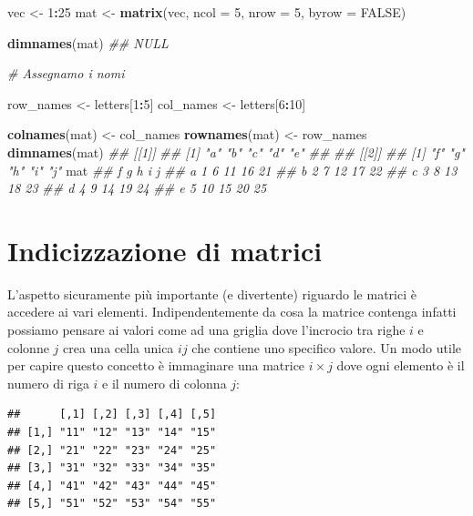 \documentclass[
]{book}
\newenvironment{Shaded}{\begin{snugshade}}{\end{snugshade}}
\newcommand{\CommentTok}[1]{\textcolor[rgb]{0.56,0.35,0.01}{\textit{#1}}}
\newcommand{\DataTypeTok}[1]{\textcolor[rgb]{0.13,0.29,0.53}{#1}}
\newcommand{\DecValTok}[1]{\textcolor[rgb]{0.00,0.00,0.81}{#1}}
\newcommand{\KeywordTok}[1]{\textcolor[rgb]{0.13,0.29,0.53}{\textbf{#1}}}
\newcommand{\NormalTok}[1]{#1}
\newcommand{\OperatorTok}[1]{\textcolor[rgb]{0.81,0.36,0.00}{\textbf{#1}}}
\newcommand{\OtherTok}[1]{\textcolor[rgb]{0.56,0.35,0.01}{#1}}
\newcommand{\StringTok}[1]{\textcolor[rgb]{0.31,0.60,0.02}{#1}}
\begin{document}
\begin{Shaded}
\begin{Highlighting}[]
\NormalTok{vec <-}\StringTok{ }\DecValTok{1}\OperatorTok{:}\DecValTok{25}
\NormalTok{mat <-}\StringTok{ }\KeywordTok{matrix}\NormalTok{(vec, }\DataTypeTok{ncol =} \DecValTok{5}\NormalTok{, }\DataTypeTok{nrow =} \DecValTok{5}\NormalTok{, }\DataTypeTok{byrow =} \OtherTok{FALSE}\NormalTok{)}

\KeywordTok{dimnames}\NormalTok{(mat)}
\CommentTok{## NULL}

\CommentTok{# Assegnamo i nomi}

\NormalTok{row_names <-}\StringTok{ }\NormalTok{letters[}\DecValTok{1}\OperatorTok{:}\DecValTok{5}\NormalTok{]}
\NormalTok{col_names <-}\StringTok{ }\NormalTok{letters[}\DecValTok{6}\OperatorTok{:}\DecValTok{10}\NormalTok{]}

\KeywordTok{colnames}\NormalTok{(mat) <-}\StringTok{ }\NormalTok{col_names}
\KeywordTok{rownames}\NormalTok{(mat) <-}\StringTok{ }\NormalTok{row_names}
\KeywordTok{dimnames}\NormalTok{(mat)}
\CommentTok{## [[1]]}
\CommentTok{## [1] "a" "b" "c" "d" "e"}
\CommentTok{## }
\CommentTok{## [[2]]}
\CommentTok{## [1] "f" "g" "h" "i" "j"}
\NormalTok{mat}
\CommentTok{##   f  g  h  i  j}
\CommentTok{## a 1  6 11 16 21}
\CommentTok{## b 2  7 12 17 22}
\CommentTok{## c 3  8 13 18 23}
\CommentTok{## d 4  9 14 19 24}
\CommentTok{## e 5 10 15 20 25}
\end{Highlighting}
\end{Shaded}

\hypertarget{indicizzazione-di-matrici}{%
\section{Indicizzazione di matrici}\label{indicizzazione-di-matrici}}

L'aspetto sicuramente più importante (e divertente) riguardo le matrici è accedere ai vari elementi. Indipendentemente da cosa la matrice contenga infatti possiamo pensare ai valori come ad una griglia dove l'incrocio tra righe \(i\) e colonne \(j\) crea una cella unica \(ij\) che contiene uno specifico valore. Un modo utile per capire questo concetto è immaginare una matrice \(i \times j\) dove ogni elemento è il numero di riga \(i\) e il numero di colonna \(j\):

\begin{verbatim}
##      [,1] [,2] [,3] [,4] [,5]
## [1,] "11" "12" "13" "14" "15"
## [2,] "21" "22" "23" "24" "25"
## [3,] "31" "32" "33" "34" "35"
## [4,] "41" "42" "43" "44" "45"
## [5,] "51" "52" "53" "54" "55"
\end{verbatim}
\end{document}
